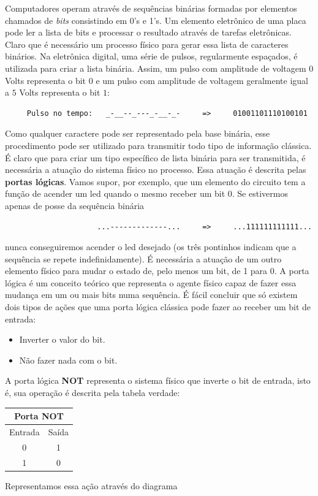 \documentclass{article}
\begin{document}
Computadores operam através de sequências binárias formadas por elementos chamados de \textit{bits} consistindo em 0's e 1's. Um elemento eletrônico de uma placa pode ler a lista de bits e processar o resultado através de tarefas eletrônicas. Claro que é necessário um processo físico para gerar essa lista de caracteres binários. Na eletrônica digital, uma série de pulsos, regularmente espaçados, é utilizada para criar a lista binária. Assim, um pulso com amplitude de voltagem 0 Volts representa o bit $0$ e um pulso com amplitude de voltagem geralmente igual a $5$ Volts representa o bit $1$:
\begin{center}
    \begin{verbatim}
     Pulso no tempo:   _-__--_---_-__-_-     =>     01001101110100101
    \end{verbatim}
\end{center}
Como qualquer caractere pode ser representado pela base binária, esse procedimento pode ser utilizado para transmitir todo tipo de informação clássica. É claro que para criar um tipo específico de lista binária para ser transmitida, é necessária a atuação do sistema físico no processo. Essa atuação é descrita pelas \textbf{portas lógicas}. Vamos supor, por exemplo, que um elemento do circuito tem a função de acender um led quando o mesmo receber um bit $0$. Se estivermos apenas de posse da sequência binária
\begin{center}
    \begin{verbatim}
                     ...-------------...     =>     ...111111111111...
    \end{verbatim}
\end{center}
nunca conseguiremos acender o led desejado (os três pontinhos indicam que a sequência se repete indefinidamente). É necessária a atuação de um outro elemento físico para mudar o estado de, pelo menos um bit, de 1 para 0. A porta lógica é um conceito teórico que representa o agente físico capaz de fazer essa mudança em um ou mais bits numa sequência. É fácil concluir que só existem dois tipos de ações que uma porta lógica clássica pode fazer ao receber um bit de entrada:
\begin{itemize}
    \item Inverter o valor do bit.
    \item Não fazer nada com o bit.
\end{itemize}
A porta lógica \textbf{NOT} representa o sistema físico que inverte o bit de entrada, isto é, sua operação é descrita pela tabela verdade:
\begin{center}
\begin{tabular} { |c|c|  }
 \hline
 \multicolumn{2}{|c|}{Porta \textbf{NOT}} \\
 \hline
 Entrada & Saída\\
 \hline
 0   & 1\\
 1   & 0\\
 \hline
\end{tabular}
\end{center}
Representamos essa ação através do diagrama
\end{document}
